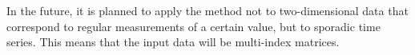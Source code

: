 \documentclass[bst/sn-mathphys]{sn-jnl}%
\theoremstyle{thmstyleone}%
\theoremstyle{thmstyletwo}%
\theoremstyle{thmstylethree}%
\begin{document}
In the future, it is planned to apply the method not to two-dimensional data that correspond to regular measurements of a certain value, but to sporadic time series.
This means that the input data will be multi-index matrices.



%

\end{document}
